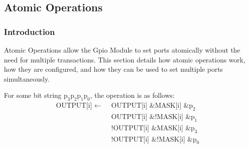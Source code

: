 \subsection{Atomic Operations}

\subsubsection{Introduction}
Atomic Operations allow the Gpio Module to set ports atomically without the need for multiple transactions. This section details how atomic operations work, how they are configured, and how they can be used to set multiple ports simultaneously.

For some bit string $\text{p}_3\text{p}_2\text{p}_1\text{p}_0$, the operation is as follows:
\begin{equation*}
  \begin{split}
    \text{OUTPUT[i] }\leftarrow\text{ }&\text{OUTPUT[i]} \text{ \& } \text{MASK[i]} \text{ \& } \text{p}_2\\
                        &\text{OUTPUT[i]} \text{ \& } \text{!MASK[i]} \text{ \& } \text{p}_1\\
                        &\text{!OUTPUT[i]} \text{ \& } \text{MASK[i]} \text{ \& } \text{p}_3\\
                        &\text{!OUTPUT[i]} \text{ \& } \text{!MASK[i]} \text{ \& } \text{p}_0
  \end{split}
\end{equation*}






